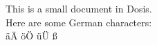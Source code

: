 \documentclass{article}
\begin{document}
This is a small document in Dosis.
\\
Here are some German characters:
\\
äÄ öÖ üÜ ß
\end{document}
